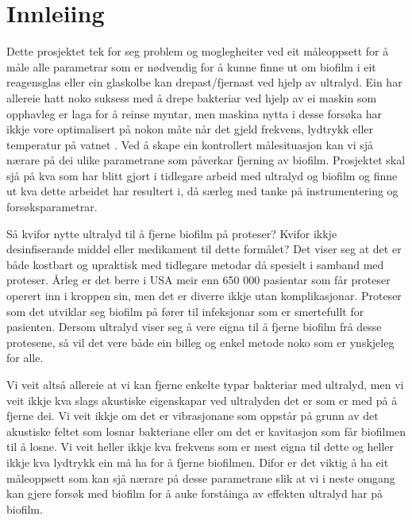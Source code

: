 \section{Innleiing}
Dette prosjektet tek for seg problem og moglegheiter ved eit måleoppsett for å måle alle parametrar som er nødvendig for å kunne finne ut om biofilm i eit reagensglas eller ein glaskolbe kan drepast/fjernast ved hjelp av ultralyd. Ein har allereie hatt noko suksess med å drepe bakteriar ved hjelp av ei maskin som opphavleg er laga for å reinse myntar, men maskina nytta i desse forsøka har ikkje vore optimalisert på nokon måte når det gjeld frekvens, lydtrykk eller temperatur på vatnet \cite{ultraprotese}. Ved å skape ein kontrollert målesituasjon kan vi sjå nærare på dei ulike parametrane som påverkar fjerning av biofilm. Prosjektet skal sjå på kva som har blitt gjort i tidlegare arbeid med ultralyd og biofilm og finne ut kva dette arbeidet har resultert i, då særleg med tanke på instrumentering og forsøksparametrar.

Så kvifor nytte ultralyd til å fjerne biofilm på proteser? Kvifor ikkje desinfiserande middel eller medikament til dette formålet? Det viser seg at det er både kostbart og upraktisk med tidlegare metodar då spesielt i samband med proteser. Årleg er det berre i USA meir enn 650 000 pasientar som får proteser operert inn i kroppen sin, men det er diverre ikkje utan komplikasjonar\cite{ultraprotese}. Proteser som det utviklar seg biofilm på fører til infeksjonar som er smertefullt for pasienten\cite{infection}. Dersom ultralyd viser seg å vere eigna til å fjerne biofilm frå desse protesene, så vil det vere både ein billeg og enkel metode noko som er ynskjeleg for alle.

Vi veit altså allereie at vi kan fjerne enkelte typar bakteriar med ultralyd, men vi veit ikkje kva slags akustiske eigenskapar ved ultralyden det er som er med på å fjerne dei\cite{ultraprotese}. Vi veit ikkje om det er vibrasjonane som oppstår på grunn av det akustiske feltet som losnar bakteriane eller om det er kavitasjon som får biofilmen til å losne. Vi veit heller ikkje kva frekvens som er mest eigna til dette og heller ikkje kva lydtrykk ein må ha for å fjerne biofilmen. Difor er det viktig å ha eit måleoppsett som kan sjå nærare på desse parametrane slik at vi i neste omgang kan gjere forsøk med biofilm for å auke forståinga av effekten ultralyd har på biofilm.